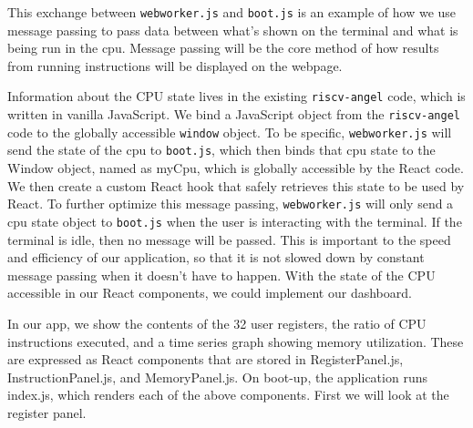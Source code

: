 This exchange between \texttt{webworker.js} and \texttt{boot.js} is an example of how we use message passing
to pass data between what's shown on the terminal and what is being run in the cpu. Message passing
will be the core method of how results from running instructions will be displayed on the webpage.

Information about the CPU state lives in the existing \texttt{riscv-angel} code, which is written in
vanilla JavaScript. We bind a JavaScript object from the
\texttt{riscv-angel} code
to the globally accessible \texttt{window} object.
To be specific, \texttt{webworker.js} will send the state of the cpu to \texttt{boot.js}, which then binds that cpu state
to the Window object, named as myCpu, which is globally accessible by the React code.
We then create a custom React hook that safely retrieves this state to be used by React.
To further optimize this message passing, \texttt{webworker.js} will only send a cpu state object to \texttt{boot.js}
when the user is interacting with the terminal. If the terminal is idle, then no message will be passed.
This is important to the speed and efficiency of our application, so that it is not slowed down
by constant message passing when it doesn't have to happen.
With the state of the CPU accessible in our React components, we could implement our
dashboard.

In our app, we show the contents of the 32 user registers, the ratio of CPU instructions executed,
and a time series graph showing memory utilization. These are expressed as React components that are
stored in RegisterPanel.js, InstructionPanel.js, and MemoryPanel.js. On boot-up, the application
runs index.js, which renders each of the above components. First we will look at the register panel.

